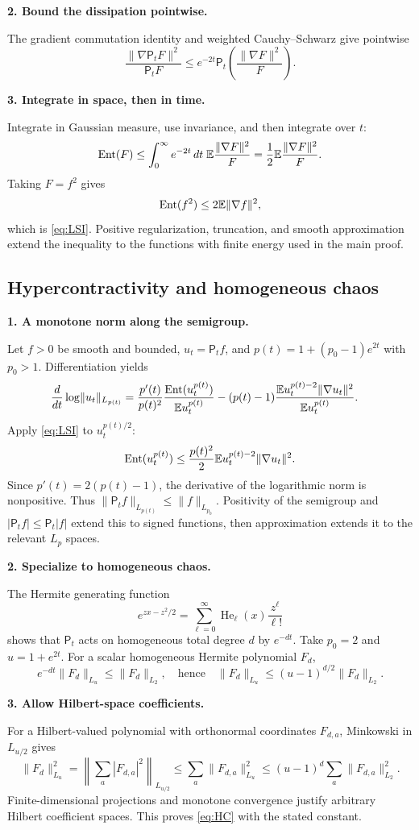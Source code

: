 \documentclass[11pt]{article}
\numberwithin{equation}{section}
\theoremstyle{definition}\newtheorem{definition}[theorem]{Definition}
\theoremstyle{remark}\newtheorem{remark}[theorem]{Remark}
\newcommand{\norm}[1]{\lVert#1\rVert}\newcommand{\ip}[2]{\langle#1,#2\rangle}
\newcommand{\step}[1]{\par\addvspace{.65\baselineskip}\Needspace{4\baselineskip}\noindent\textbf{#1}\par\nobreak\smallskip}
\begin{document}
\step{2. Bound the dissipation pointwise.}
The gradient commutation identity and weighted Cauchy--Schwarz give pointwise
\[
 \frac{\norm{\nabla\mathsf P_tF}^2}{\mathsf P_tF}
 \le e^{-2t}\mathsf P_t\left(\frac{\norm{\nabla F}^2}{F}\right).
\]

\step{3. Integrate in space, then in time.}
Integrate in Gaussian measure, use invariance, and then integrate over $t$:
\[
 \Ent(F)
 \le\int_0^\infty e^{-2t}\,dt\;
 \E\frac{\norm{\nabla F}^2}{F}
 =\frac12\E\frac{\norm{\nabla F}^2}{F}.
\]
Taking $F=f^2$ gives
\[
 \Ent(f^2)\le2\E\norm{\nabla f}^2,
\]
which is \eqref{eq:LSI}. Positive regularization, truncation, and smooth
approximation extend the inequality to the functions with finite energy used
in the main proof.

\subsection{Hypercontractivity and homogeneous chaos}
\step{1. A monotone norm along the semigroup.}
Let $f>0$ be smooth and bounded, $u_t=\mathsf P_tf$, and
$p(t)=1+(p_0-1)e^{2t}$ with $p_0>1$. Differentiation yields
\begin{align*}
 \frac{d}{dt}\log\norm{u_t}_{L_{p(t)}}
 &=\frac{p'(t)}{p(t)^2}
   \frac{\Ent(u_t^{p(t)})}{\E u_t^{p(t)}}
 -(p(t)-1)\frac{\E u_t^{p(t)-2}\norm{\nabla u_t}^2}{\E u_t^{p(t)}}.
\end{align*}
Apply \eqref{eq:LSI} to $u_t^{p(t)/2}$:
\[
 \Ent(u_t^{p(t)})
 \le\frac{p(t)^2}{2}\E u_t^{p(t)-2}\norm{\nabla u_t}^2.
\]
Since $p'(t)=2(p(t)-1)$, the derivative of the logarithmic norm is nonpositive.
Thus $\norm{\mathsf P_tf}_{L_{p(t)}}\le\norm f_{L_{p_0}}$.
Positivity of the semigroup and $|\mathsf P_tf|\le\mathsf P_t|f|$ extend this to
signed functions, then approximation extends it to the relevant $L_p$ spaces.

\step{2. Specialize to homogeneous chaos.}
The Hermite generating function
\[
 e^{zx-z^2/2}=\sum_{\ell=0}^\infty\operatorname{He}_\ell(x)\frac{z^\ell}{\ell!}
\]
shows that $\mathsf P_t$ acts on homogeneous total degree $d$ by $e^{-dt}$.
Take $p_0=2$ and $u=1+e^{2t}$. For a scalar homogeneous Hermite polynomial $F_d$,
\[
 e^{-dt}\norm{F_d}_{L_u}\le\norm{F_d}_{L_2},
 \quad\text{hence}\quad
 \norm{F_d}_{L_u}\le(u-1)^{d/2}\norm{F_d}_{L_2}.
\]

\step{3. Allow Hilbert-space coefficients.}
For a Hilbert-valued polynomial with orthonormal coordinates $F_{d,a}$,
Minkowski in $L_{u/2}$ gives
\[
 \norm{F_d}_{L_u}^2
 =\left\|\sum_a|F_{d,a}|^2\right\|_{L_{u/2}}
 \le\sum_a\norm{F_{d,a}}_{L_u}^2
 \le(u-1)^d\sum_a\norm{F_{d,a}}_{L_2}^2.
\]
Finite-dimensional projections and monotone convergence justify arbitrary
Hilbert coefficient spaces. This proves \eqref{eq:HC} with the stated constant.
\end{document}
